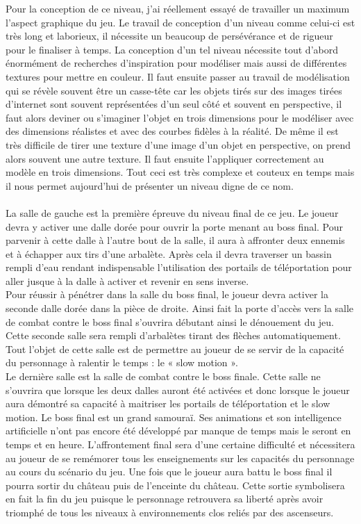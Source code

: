 \documentclass[12pt]{article}
\begin{document}
Pour la conception de ce niveau, j'ai réellement essayé de travailler un maximum l'aspect graphique du jeu. Le travail de conception d'un niveau comme celui-ci est très long et laborieux, il nécessite un beaucoup de persévérance et de rigueur pour le finaliser à temps. La conception d'un tel niveau nécessite tout d'abord énormément de recherches d'inspiration pour modéliser mais aussi de différentes textures pour mettre en couleur. Il faut ensuite passer au travail de modélisation qui se révèle souvent être un casse-tête car les objets tirés sur des images tirées d'internet sont souvent représentées d'un seul côté et souvent en perspective, il faut alors deviner ou s'imaginer l'objet en trois dimensions pour le modéliser avec des dimensions réalistes et avec des courbes fidèles à la réalité. De même il est très difficile de tirer une texture d'une image d'un objet en perspective, on prend alors souvent une autre texture. Il faut ensuite l'appliquer correctement au modèle en trois dimensions. Tout ceci est très complexe et couteux en temps mais il nous permet aujourd'hui de présenter un niveau digne de ce nom.\\\\
La salle de gauche est la première épreuve du niveau final de ce jeu. Le joueur devra y activer une dalle dorée pour ouvrir la porte menant au boss final. Pour parvenir à cette dalle à l'autre bout de la salle, il aura à affronter deux ennemis et à échapper aux tirs d'une arbalète. Après cela il devra traverser un bassin rempli d'eau rendant indispensable l'utilisation des portails de téléportation pour aller jusque à la dalle à activer et revenir en sens inverse.\\
Pour réussir à pénétrer dans la salle du boss final, le joueur devra activer la seconde dalle dorée dans la pièce de droite. Ainsi fait la porte d'accès vers la salle de combat contre le boss final s'ouvrira débutant ainsi le dénouement du jeu. Cette seconde salle sera rempli d'arbalètes tirant des flèches automatiquement. Tout l'objet de cette salle est de permettre au joueur de se servir de la capacité du personnage à ralentir le temps : le « slow motion ».\\
Le dernière salle est la salle de combat contre le boss finale. Cette salle ne s'ouvrira que lorsque les deux dalles auront été activées et donc lorsque le joueur aura démontré sa capacité à maitriser les portails de téléportation et le slow motion. Le boss final est un grand samouraï. Ses animations et son intelligence artificielle n'ont pas encore été développé par manque de temps mais le seront en temps et en heure. L'affrontement final sera d'une certaine difficulté et nécessitera au joueur de se remémorer tous les enseignements sur les capacités du personnage au cours du scénario du jeu. Une fois que le joueur aura battu le boss final il pourra sortir du château puis de l'enceinte du château. Cette sortie symbolisera en fait la fin du jeu puisque le personnage retrouvera sa liberté après avoir triomphé de tous les niveaux à environnements clos reliés par des ascenseurs.
\end{document}
